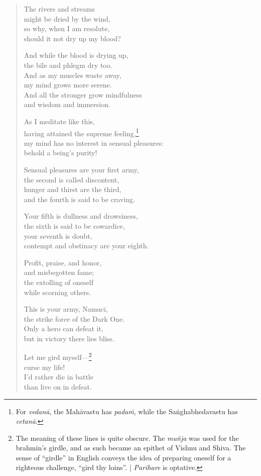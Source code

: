 \documentclass[12pt,openany]{book}%
\begin{document}
\begin{verse}
The rivers and streams \\
might be dried by the wind, \\
so why, when I am resolute, \\
should it not dry up my blood? 

And while the blood is drying up, \\
the bile and phlegm dry too. \\
And as my muscles waste away, \\
my mind grows more serene. \\
And all the stronger grow mindfulness \\
and wisdom and immersion. 

As I meditate like this, \\
having attained the supreme feeling,\footnote{For \textit{\textsanskrit{vedanā}}, the \textsanskrit{Mahāvastu} has \textit{\textsanskrit{padaṁ}}, while the \textsanskrit{Saṅghabhedavastu} has \textit{\textsanskrit{cetanā}}. } \\
my mind has no interest in sensual pleasures: \\
behold a being’s purity! 

Sensual pleasures are your first army, \\
the second is called discontent, \\
hunger and thirst are the third, \\
and the fourth is said to be craving. 

Your fifth is dullness and drowsiness, \\
the sixth is said to be cowardice, \\
your seventh is doubt, \\
contempt and obstinacy are your eighth. 

Profit, praise, and honor, \\
and misbegotten fame; \\
the extolling of oneself \\
while scorning others. 

This is your army, \textsanskrit{Namucī}, \\
the strike force of the Dark One. \\
Only a hero can defeat it, \\
but in victory there lies bliss. 

Let me gird myself—\footnote{The meaning of these lines is quite obscure. The \textit{\textsanskrit{muñja}} was used for the brahmin’s girdle, and as such became an epithet of Vishnu and Shiva. The sense of “girdle” in English conveys the idea of preparing oneself for a righteous challenge, “gird thy loins”. | \textit{Parihare} is optative. } \\
curse my life! \\
I’d rather die in battle \\
than live on in defeat. 


\end{verse}
\end{document}
